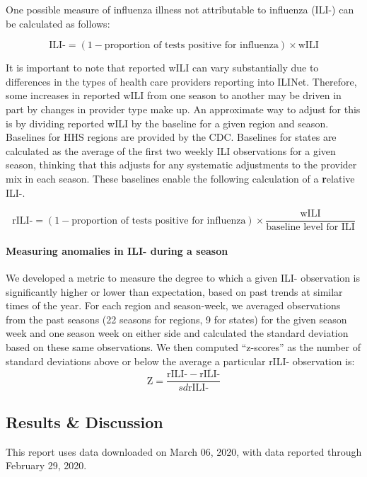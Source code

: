 \documentclass[]{article}
\let\oldparagraph\paragraph
\renewcommand{\paragraph}[1]{\oldparagraph{#1}\mbox{}}
\begin{document}
One possible measure of influenza illness not attributable to influenza
(ILI-) can be calculated as follows:

\[\text{ILI-} = (1 - \text{proportion of tests positive for influenza}) \times \text{wILI}\]

It is important to note that reported wILI can vary substantially due to
differences in the types of health care providers reporting into ILINet.
Therefore, some increases in reported wILI from one season to another
may be driven in part by changes in provider type make up. An
approximate way to adjust for this is by dividing reported wILI by the
baseline for a given region and season. Baselines for HHS regions are
provided by the CDC. Baselines for states are calculated as the average
of the first two weekly ILI observations for a given season, thinking
that this adjusts for any systematic adjustments to the provider mix in
each season. These baselines enable the following calculation of a
\textbf{r}elative ILI-.

\[\text{rILI-} = (1 - \text{proportion of tests positive for influenza}) \times \frac{\text{wILI}}{\text{baseline level for ILI}}\]

\hypertarget{measuring-anomalies-in-ili--during-a-season}{%
\paragraph{Measuring anomalies in ILI- during a
season}\label{measuring-anomalies-in-ili--during-a-season}}

We developed a metric to measure the degree to which a given ILI-
observation is significantly higher or lower than expectation, based on
past trends at similar times of the year. For each region and
season-week, we averaged observations from the past seasons (22 seasons
for regions, 9 for states) for the given season week and one season week
on either side and calculated the standard deviation based on these same
observations. We then computed ``z-scores'' as the number of standard
deviations above or below the average a particular rILI- observation is:
\[\text{Z} =  \frac{\text{rILI-} - \overline{\text{rILI-}}}{sd{\text{rILI-}}}\]

\hypertarget{results-discussion}{%
\subsection{Results \& Discussion}\label{results-discussion}}

This report uses data downloaded on March 06, 2020, with data reported
through February 29, 2020.
\end{document}
